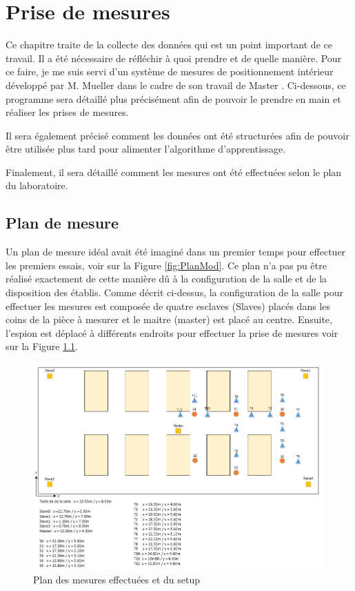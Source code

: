 \chapter{Prise de mesures}
Ce chapitre traite de la collecte des données qui est un point important de ce travail. Il a été nécessaire de réfléchir à quoi prendre et de quelle manière. Pour ce faire, je me suis servi d'un système de mesures de positionnement intérieur développé par M. Mueller dans le cadre de son travail de Master \cite{MIC}. Ci-dessous, ce programme sera détaillé plus précisément afin de pouvoir le prendre en main et réaliser les prises de mesures. 

Il sera également précisé comment les données ont été structurées afin de pouvoir être utilisée plus tard pour alimenter l'algorithme d'apprentissage. 

Finalement, il sera détaillé comment les mesures ont été effectuées selon le plan du laboratoire.

\section{Plan de mesure}
Un plan de mesure idéal avait été imaginé dans un premier temps pour effectuer les premiers essais, voir sur la Figure \ref{fig:PlanMod}. Ce plan n'a pas pu être réalisé exactement de cette manière dû à la configuration de la salle et de la disposition des établis. Comme décrit ci-dessus, la configuration de la salle pour effectuer les mesures est composée de quatre esclaves (Slaves) placés dans les coins de la pièce à mesurer et le maitre (master) est placé au centre. Ensuite, l'espion est déplacé à différents endroits pour effectuer la prise de mesures voir sur la Figure \ref{fig:mesures}.

\begin{figure}[htp]
 \begin{center}
  \includegraphics[scale=0.7]{figures/mesures.png}
  \caption{Plan des mesures effectuées et du setup}
  \label{fig:mesures} %
 \end{center}
\end{figure}

